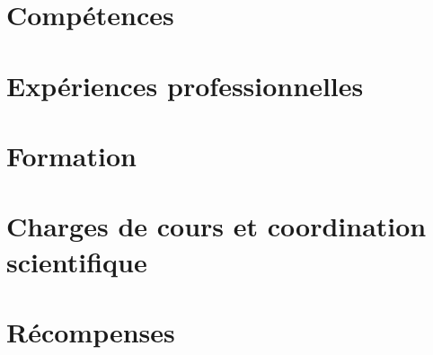 \documentclass{prometheus_cv}
\begin{document}
\thispagestyle{empty}				%
\pagestyle{fancy}			 		%

\vspace*{-1cm}
\centering 


\vspace*{0.4cm}
\section{Compétences}


\vspace*{0.4cm}
\section{Expériences professionnelles}


\vspace*{0.4cm}
\section{Formation}


\section{Charges de cours et coordination scientifique}


\section{Récompenses}


\printbibliography[title={Publications}, keyword={publications}]
\printbibliography[title={Communications}, keyword={communications}]
\end{document}
